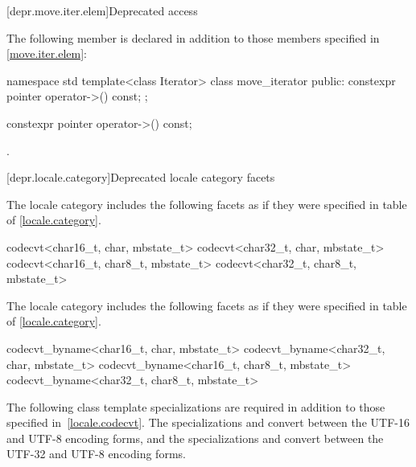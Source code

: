 [depr.move.iter.elem]{Deprecated  access}

\pnum
The following member is declared in addition to those members
specified in \ref{move.iter.elem}:

\begin{codeblock}
namespace std {
  template<class Iterator>
  class move_iterator {
  public:
    constexpr pointer operator->() const;
  };
}
\end{codeblock}

%
\begin{itemdecl}
constexpr pointer operator->() const;
\end{itemdecl}

\begin{itemdescr}
\pnum
\returns
{}.
\end{itemdescr}

[depr.locale.category]{Deprecated locale category facets}

\pnum
The  locale category includes the following facets
as if they were specified
in table  of \ref{locale.category}.

\begin{codeblock}
codecvt<char16_t, char, mbstate_t>
codecvt<char32_t, char, mbstate_t>
codecvt<char16_t, char8_t, mbstate_t>
codecvt<char32_t, char8_t, mbstate_t>
\end{codeblock}

\pnum
The  locale category includes the following facets
as if they were specified
in table  of \ref{locale.category}.

\begin{codeblock}
codecvt_byname<char16_t, char, mbstate_t>
codecvt_byname<char32_t, char, mbstate_t>
codecvt_byname<char16_t, char8_t, mbstate_t>
codecvt_byname<char32_t, char8_t, mbstate_t>
\end{codeblock}

\pnum
The following class template specializations are required
in addition to those specified in~\ref{locale.codecvt}.
%
%
The specializations  and
convert between the UTF-16 and UTF-8 encoding forms, and
%
the specializations  and
convert between the UTF-32 and UTF-8 encoding forms.

